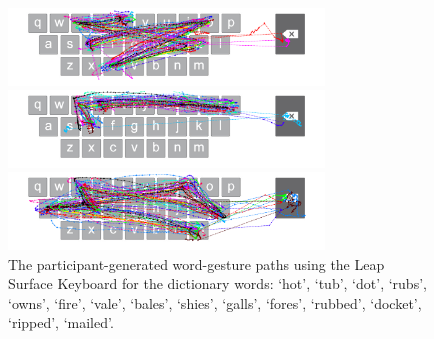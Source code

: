 \begin{figure}[t]
	\begin{minipage}[t]{8in}
	\hspace{-20pt}
	\begin{minipage}[t]{3.1in}
		\includegraphics[width=3.3in]{Figures/fig_docket_paths}
	\end{minipage}
	\begin{minipage}[t]{3in}
		\includegraphics[width=3.3in]{Figures/fig_ripped_paths}
	\end{minipage}
	\end{minipage}
	
	\begin{minipage}[t]{8in}
	\hspace{-20pt}
	\begin{minipage}[t]{3.1in}
		\includegraphics[width=3.3in]{Figures/fig_mailed_paths}
	\end{minipage}
	\end{minipage}
	\caption[User Generated Paths for the Leap Surface Keyboard]{The participant-generated word-gesture paths using the Leap Surface Keyboard for the dictionary words: `hot', `tub', `dot', `rubs', `owns', `fire', `vale', `bales', `shies', `galls', `fores', `rubbed', `docket', `ripped', `mailed'.}
\end{figure}

\clearpage


